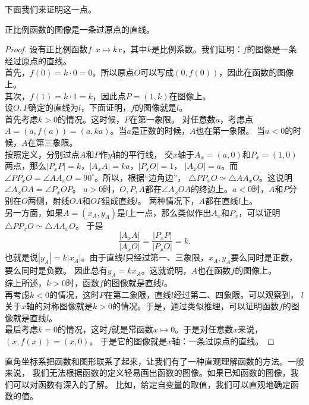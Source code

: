 \documentclass[12pt,UTF8]{ctexbook}
\begin{document}
下面我们来证明这一点。

\begin{tm}\label{tm:5-0-0}
    正比例函数的图像是一条过原点的直线。
\end{tm}
\begin{proof}
    设有正比例函数$f: x \mapsto kx$，其中$k$是比例系数。我们证明：$f$的图像是一条经过原点的直线。\\
    首先，$f(0) = k\cdot 0 = 0$。所以原点$O$可以写成$(0, f(0))$，因此在函数的图像上。\\
    其次，$f(1) = k\cdot 1 = k$，因此点$P = (1, k)$在图像上。\\
    设$O,P$确定的直线为$l$，下面证明，$f$的图像就是$l$。\\
    首先考虑$k > 0$的情况。这时候，$P$在第一象限。
    对任意数$a$，考虑点$A = (a, f(a)) = (a, ka)$。当$a$是正数的时候，$A$也在第一象限。
    当$a < 0$的时候，$A$在第三象限。\\
    按照定义，分别过点$A$和$P$作$y$轴的平行线，
    交$x$轴于$A_x = (a, 0)$和$P_x = (1, 0)$两点，那么$|P_xP| = k$，$|A_xA| = ka$，$|P_xO| = 1$，
    $|A_xO| = a$。而$\angle PP_xO = \angle AA_xO = 90^\circ$。所以，根据“边角边”，
    $\triangle PP_xO \simeq \triangle AA_xO$。这说明$\angle A_xOA = \angle P_xOP$。
    $a>0$时，$O,P,A$都在$\angle A_xOA$的终边上。$a<0$时，$A$和$P$分别在$O$两侧，射线$OA$和$OP$组成直线$l$。
    两种情况下，$A$都在直线$l$上。\\
    另一方面，如果$A = (x_A, y_A)$是$l$上一点，那么类似作出$A_x$和$P_x$，可以证明$\triangle PP_xO \simeq \triangle AA_xO$。
    于是
    $$ \frac{|A_xA|}{|A_xO|} = \frac{|P_xP|}{|P_xO|} = k.$$
    也就是说$|y_A| = k|x_A|$。由于直线$l$只经过第一、三象限，$x_A, y_A$要么同时是正数，要么同时是负数。
    因此总有$y_A = kx_A$。这就说明，$A$也在函数$f$的图像上。\\
    综上所述，$k>0$时，函数$f$的图像就是直线$l$。\\
    再考虑$k<0$的情况，这时$P$在第二象限，直线$l$经过第二、四象限。可以观察到，
    $l$关于$x$轴的对称图像就是$k>0$的情况。于是，通过类似推理，可以证明函数$f$的图像就是直线$l$。\\
    最后考虑$k=0$的情况，这时$f$就是常函数$x\mapsto 0$。于是对任意数$x$来说，$(x, f(x)) = (x, 0)$。
    于是它的图像就是$x$轴：一条过原点的直线。
\end{proof}

直角坐标系把函数和图形联系了起来，让我们有了一种直观理解函数的方法。一般来说，
我们无法根据函数的定义轻易画出函数的图像。如果已知函数的图像，我们可以对函数有深入的了解。
比如，给定自变量的取值，我们可以直观地确定函数的值。
\end{document}
